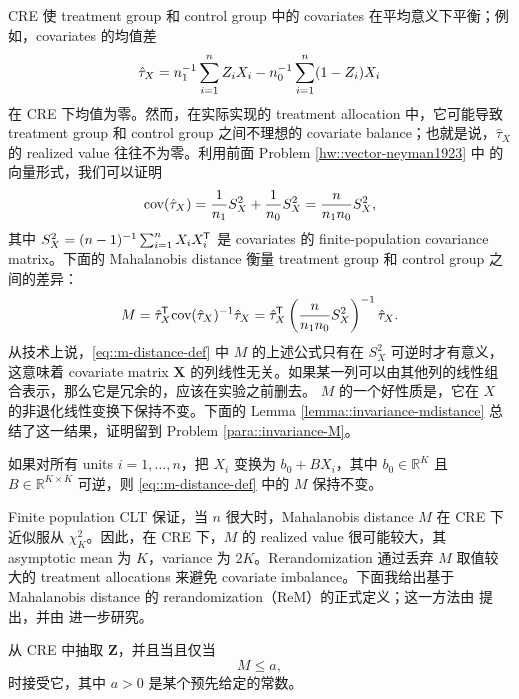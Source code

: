 CRE 使 treatment group 和 control group 中的 covariates 在平均意义下平衡；例如，covariates 的均值差
$$
\hat{\tau}_X  = n_1^{-1} \sum_{i=1}^n Z_i X_i - n_0^{-1} \sum_{i=1}^n (1-Z_i) X_i
$$
在 CRE 下均值为零。然而，在实际实现的 treatment allocation 中，它可能导致 treatment group 和 control group 之间不理想的 covariate balance；也就是说，$\hat{\tau}_X  $ 的 realized value 往往不为零。利用前面 Problem \ref{hw::vector-neyman1923} 中 \citet{Neyman:1923} 的向量形式，我们可以证明
$$
\textup{cov}(\hat{\tau}_X  ) 
= \frac{1}{n_1}  S_X^2  + \frac{1}{n_0}  S_X^2   
=  \frac{n}{n_1 n_0} S_X^2   ,
$$
其中 $ S_X^2   = (n-1)^{-1} \sum_{i=1}^n  X_i X_i^{\mkern-1.5mu\mathsf{T}} $ 是 covariates 的 finite-population covariance matrix。下面的 Mahalanobis distance 衡量 treatment group 和 control group 之间的差异：
\begin{equation}
\label{eq::m-distance-def}
M = \hat{\tau}_X ^{\mkern-1.5mu\mathsf{T}} \textup{cov}(\hat{\tau}_X  )^{-1} \hat{\tau}_X  = \hat{\tau}_X ^{\mkern-1.5mu\mathsf{T}}  \left(  \frac{n}{n_1 n_0} S_X^2   \right)^{-1} \hat{\tau}_X  . 
\end{equation}
从技术上说，\eqref{eq::m-distance-def} 中 $M$ 的上述公式只有在 $S_X^2 $ 可逆时才有意义，这意味着 covariate matrix $\boldsymbol{X}$ 的列线性无关。如果某一列可以由其他列的线性组合表示，那么它是冗余的，应该在实验之前删去。
$M$ 的一个好性质是，它在 $X$ 的非退化线性变换下保持不变。下面的 Lemma \ref{lemma::invariance-mdistance} 总结了这一结果，证明留到 Problem \ref{para::invariance-M}。

\begin{lemma}\label{lemma::invariance-mdistance}
如果对所有 units $i=1,\ldots, n$，把 $X_i$ 变换为 $b_0  + BX_i$，其中 $b_0  \in \mathbb{R}^K$ 且 $B \in \mathbb{R}^{K\times K}$ 可逆，则 \eqref{eq::m-distance-def} 中的 $M$ 保持不变。
\end{lemma}

Finite population CLT \citep{li2017general} 保证，当 $n$ 很大时，Mahalanobis distance $M $ 在 CRE 下近似服从 $ \chi^2_K$。因此，在 CRE 下，$M$ 的 realized value 很可能较大，其 asymptotic mean 为 $K$，variance 为 $2K$。Rerandomization 通过丢弃 $M$ 取值较大的 treatment allocations 来避免 covariate imbalance。下面我给出基于 Mahalanobis distance 的 rerandomization（ReM）的正式定义；这一方法由 \citet{cox:1982} 提出，并由 \citet{morgan2012rerandomization} 进一步研究。


\begin{definition}
[ReM]
从 CRE 中抽取 $\boldsymbol{Z}$，并且当且仅当
$$
M \leq a,
$$  
时接受它，其中 $a > 0$ 是某个预先给定的常数。
\end{definition}

